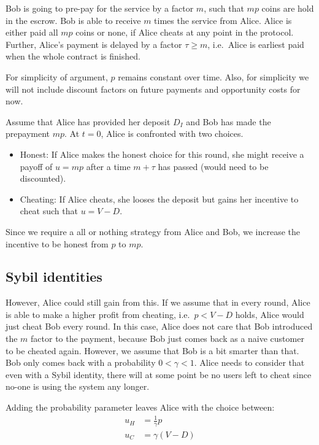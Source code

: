 Bob is going to pre-pay for the service by a factor $m$, such that $mp$ coins are hold in the escrow.
Bob is able to receive $m$ times the service from Alice.
Alice is either paid all $mp$ coins or none, if Alice cheats at any point in the protocol.
Further, Alice's payment is delayed by a factor $\tau \geq m$, i.e.\ Alice is earliest paid when the whole contract is finished.

For simplicity of argument, $p$ remains constant over time.
Also, for simplicity we will not include discount factors on future payments and opportunity costs for now.

Assume that Alice has provided her deposit $D_I$ and Bob has made the prepayment $mp$.
At $t=0$, Alice is confronted with two choices.
\begin{itemize}
    \item Honest: If Alice makes the honest choice for this round, she might receive a payoff of $u=mp$ after a time $m+\tau$ has passed (would need to be discounted).
    \item Cheating: If Alice cheats, she looses the deposit but gains her incentive to cheat such that $u=V-D$.
\end{itemize}

Since we require a all or nothing strategy from Alice and Bob, we increase the incentive to be honest from $p$ to $mp$.

\subsection{Sybil identities}
However, Alice could still gain from this.
If we assume that in every round, Alice is able to make a higher profit from cheating, i.e.\ $p < V -D$ holds, Alice would just cheat Bob every round.
In this case, Alice does not care that Bob introduced the $m$ factor to the payment, because Bob just comes back as a naive customer to be cheated again.
However, we assume that Bob is a bit smarter than that.
Bob only comes back with a probability $0 < \gamma < 1$.
Alice needs to consider that even with a Sybil identity, there will at some point be no users left to cheat since no-one is using the system any longer.

Adding the probability parameter leaves Alice with the choice between:
\begin{align}
    u_H &= \frac{1}{\gamma} p \\
    u_C &= \gamma (V - D)
\end{align}



